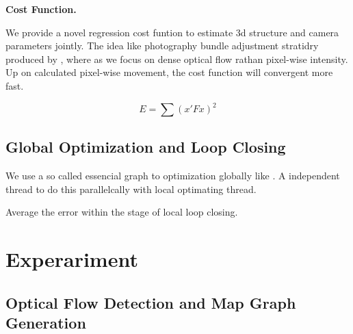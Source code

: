 \documentclass{article}
\begin{document}
\textbf{Cost Function.}

We provide a novel regression cost funtion to estimate 3d structure and camera parameters jointly. The idea like photography bundle adjustment stratidry produced by \cite{Delaunoy2014Photometric}, where as we focus on dense optical flow rathan pixel-wise intensity. Up on calculated pixel-wise movement, the cost function will convergent more fast.


\begin{displaymath}
E=\sum (x'Fx)^2
\end{displaymath}

\subsection{Global Optimization and Loop Closing}

We use a so called essencial graph to optimization globally like \cite{Mur2017ORB}. A independent thread to do this parallelcally with local optimating thread.\par

Average the error within the stage of local loop closing.

\section{Experariment}

\subsection{Optical Flow Detection and Map Graph Generation}
\end{document}
